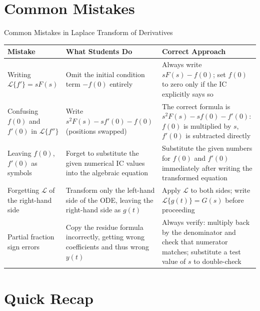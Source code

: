 \documentclass[12pt,a4paper]{article}
\begin{document}
\section{Common Mistakes}

\begin{mistakebox}{Common Mistakes in Laplace Transform of Derivatives}
\begin{tabular}{@{} p{4.5cm} p{5cm} p{5cm} @{}}
\toprule
\textbf{Mistake} & \textbf{What Students Do} & \textbf{Correct Approach} \\
\midrule
Writing $\mathcal{L}\{f'\} = sF(s)$ &
Omit the initial condition term $-f(0)$ entirely &
Always write $sF(s) - f(0)$; set $f(0)$ to zero only if the IC
explicitly says so \\
\midrule
Confusing $f(0)$ and $f'(0)$ in $\mathcal{L}\{f''\}$ &
Write $s^2F(s) - sf'(0) - f(0)$ (positions swapped) &
The correct formula is $s^2F(s) - sf(0) - f'(0)$: $f(0)$ is multiplied
by $s$, $f'(0)$ is subtracted directly \\
\midrule
Leaving $f(0)$, $f'(0)$ as symbols &
Forget to substitute the given numerical IC values into the algebraic
equation &
Substitute the given numbers for $f(0)$ and $f'(0)$ immediately after
writing the transformed equation \\
\midrule
Forgetting $\mathcal{L}$ of the right-hand side &
Transform only the left-hand side of the ODE, leaving the right-hand
side as $g(t)$ &
Apply $\mathcal{L}$ to both sides; write $\mathcal{L}\{g(t)\} = G(s)$
before proceeding \\
\midrule
Partial fraction sign errors &
Copy the residue formula incorrectly, getting wrong coefficients and
thus wrong $y(t)$ &
Always verify: multiply back by the denominator and check that numerator
matches; substitute a test value of $s$ to double-check \\
\bottomrule
\end{tabular}
\end{mistakebox}

\section{Quick Recap}
\end{document}
